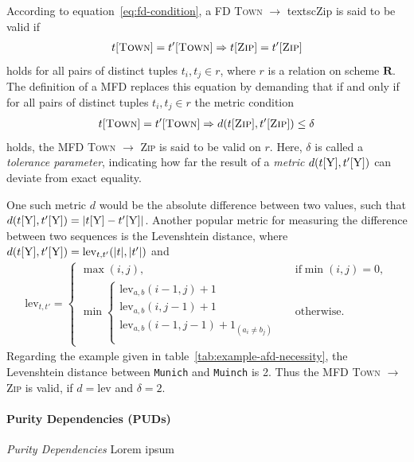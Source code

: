 According to equation~\ref{eq:fd-condition}, a FD \textsc{Town} \( \to\) textsc{Zip} is said to be valid if
\begin{align}
    t[\textsc{Town}] = t'[\textsc{Town}] \Rightarrow t[\textsc{Zip}] = t'[\textsc{Zip}]
\end{align}
holds for all pairs of distinct tuples \( t_i, t_j \in r \), where \( r \) is a relation on scheme \( \boldsymbol{R} \).
The definition of a MFD replaces this equation by demanding that if and only if for all pairs of distinct tuples \( t_i, t_j \in r \) the metric condition
\begin{align}\label{eq:mfd-condition}
    t[\textsc{Town}] = t'[\textsc{Town}] \Rightarrow d(t[\textsc{Zip}], t'[\textsc{Zip}]) \leq \delta
\end{align}
holds, the MFD \textsc{Town} \( \to\) \textsc{Zip} is said to be valid on \( r \).\cite[p.~2]{KOU09}
Here, \( \delta \) is called a \emph{tolerance parameter}, indicating how far the result of a \emph{metric} \( d(t[\textsc{Y}], t'[\textsc{Y}]) \) can deviate from exact equality.

One such metric \( d \) would be the absolute difference between two values, such that \( d(t[\textsc{Y}], t'[\textsc{Y}]) = | t[\textsc{Y}] - t'[\textsc{Y}]| \).
Another popular metric for measuring the difference between two sequences is the Levenshtein distance, where \( d(t[\textsc{Y}], t'[\textsc{Y}]) = \text{lev}_{t,t'}(|t|, |t'|) \) and
\begin{align*}
    \text{lev}_{t,t'} =
    \begin{cases}
        \max(i,j),  & \text{if} \min(i,j)=0, \\
        \min \begin{cases}
            \text{lev}_{a, b}(i-1, j)+1 & \\
            \text{lev}_{a, b}(i, j-1)+1 & \\
            \text{lev}_{a, b}(i-1, j-1)+1_{(a_i \neq b_j)} \\
        \end{cases} & \text{otherwise.}
    \end{cases}
\end{align*}
Regarding the example given in table~\ref{tab:example-afd-necessity}, the Levenshtein distance between \texttt{Munich} and \texttt{Muinch} is 2.
Thus the MFD \textsc{Town} \( \to\) \textsc{Zip} is valid, if \( d = \text{lev} \) and \( \delta = 2 \).

\paragraph{Purity Dependencies (PUDs)}
\emph{Purity Dependencies} Lorem ipsum

